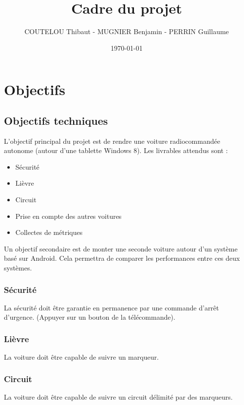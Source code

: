 \documentclass[a4paper,12pt]{article}
\title{Cadre du projet}
\author{COUTELOU Thibaut - MUGNIER Benjamin - PERRIN Guillaume}
\date{\today}
\begin{document}
\maketitle


\section{Objectifs}

\subsection{Objectifs techniques}

L'objectif principal du projet est de rendre une voiture radiocommandée
autonome (autour d'une tablette Windows 8). Les livrables attendus sont :
\begin{itemize}
    \item Sécurité
    \item Lièvre
    \item Circuit
    \item Prise en compte des autres voitures
    \item Collectes de métriques
\end{itemize}

Un objectif secondaire est de monter une seconde voiture autour d'un  système
basé sur Android.
Cela permettra de comparer les performances entre ces deux systèmes.

\subsubsection{Sécurité}

La sécurité doit être garantie en permanence par une commande d'arrêt
d'urgence. (Appuyer sur un bouton de la télécommande).

\subsubsection{Lièvre}

La voiture doit être capable de suivre un marqueur.

\subsubsection{Circuit}

La voiture doit être capable de suivre un circuit délimité par des marqueurs.
\end{document}
